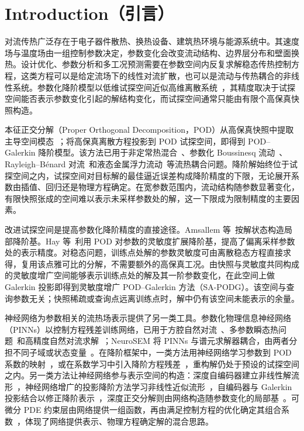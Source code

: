 \section{Introduction（引言）}
\label{sec:intro}

对流传热广泛存在于电子器件散热、换热设备、建筑热环境与能源系统中。其速度场与温度场由一组控制参数决定，参数变化会改变流动结构、边界层分布和壁面换热。设计优化、参数分析和多工况预测需要在参数空间内反复求解稳态传热控制方程，这类方程可以是给定流场下的线性对流扩散，也可以是流动与传热耦合的非线性系统。参数化降阶模型以低维试探空间近似高维离散系统~\cite{benner2015survey}，其精度取决于试探空间能否表示参数变化引起的解结构变化，而试探空间通常只能由有限个高保真快照构造。

本征正交分解（Proper Orthogonal Decomposition，POD）从高保真快照中提取主导空间模态~\cite{sirovich1987turbulence,berkooz1993proper}；将高保真离散方程投影到 POD 试探空间，即得到 POD–Galerkin 降阶模型。该方法已用于非定常热混合~\cite{georgaka2020parametric}、参数化 Boussinesq 流动~\cite{knezevic2011reduced}、Rayleigh–Bénard 对流~\cite{cai2019development,chand2024pressure}和液态金属浮力流动~\cite{star2021pod}等流热耦合问题。降阶解始终位于试探空间之内，试探空间对目标解的最佳逼近误差构成降阶精度的下限，无论展开系数由插值、回归还是物理方程确定。在宽参数范围内，流动结构随参数显著变化，有限快照张成的空间难以表示未采样参数处的解，这一下限成为限制精度的主要因素。

改进试探空间是提高参数化降阶精度的直接途径。Amsallem 等~\cite{amsallem2012nonlinear}按解状态构造局部降阶基。Hay 等~\cite{hay2009local,hay2010reduced}利用 POD 对参数的灵敏度扩展降阶基，提高了偏离采样参数处的表示精度。对稳态问题，训练点处解的参数灵敏度可由离散稳态方程直接求得，复用该点雅可比的分解，不需要额外的高保真工况。由快照与灵敏度共同构成的灵敏度增广空间能够表示训练点处的解及其一阶参数变化，在此空间上做 Galerkin 投影即得到灵敏度增广 POD–Galerkin 方法（SA-PODG）。该空间与查询参数无关；快照稀疏或查询点远离训练点时，解中仍有该空间未能表示的余量。

神经网络为参数相关的流热场表示提供了另一类工具。参数化物理信息神经网络（PINNs）以控制方程残差训练网络，已用于方腔自然对流~\cite{ye2025direct}、多参数瞬态热问题~\cite{gholampour2024parameterized}和高精度自然对流求解~\cite{cui2026comprehensive}；NeuroSEM 将 PINNs 与谱元求解器耦合，由两者分担不同子域或状态变量~\cite{shukla2025neurosem}。在降阶框架中，一类方法用神经网络学习参数到 POD 系数的映射~\cite{hesthaven2018non,weder2025galerkin}，或在系数学习中引入降阶方程残差~\cite{chen2021physics}，重构解仍处于预设的试探空间之内。另一类方法让神经网络参与表示空间的构造：深度自编码器建立非线性解流形~\cite{lee2020model,kadeethum2022non}，神经网络增广的投影降阶方法学习非线性近似流形~\cite{barnett2023neural}，自编码器与 Galerkin 投影结合以修正降阶表示~\cite{lepage2025hybrid}，深度正交分解则由网络构造随参数变化的局部基~\cite{franco2026deep}。可微分 PDE 约束层由网络提供一组函数，再由满足控制方程的优化确定其组合系数~\cite{negiar2023learning}，体现了网络提供表示、物理方程确定解的混合思路。


